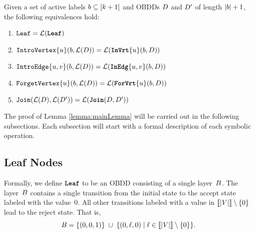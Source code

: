 \begin{lemma}
\label{lemma:mainLemma}
    Given a set of active labels $b \subseteq [k+1]$ and OBDDs $D$ and $D'$ of length $|b|+1$, the following equivalences hold:
\begin{enumerate}[label=\arabic*.,left=0pt,labelsep=2pt]
\item \label{mainLeaf} $\texttt{Leaf} = \mathcal{L}(\texttt{\textbf{Leaf}})$
\item \label{mainIntroVertex} $\texttt{IntroVertex}\{u\}(b, \mathcal{L}(D)) = \mathcal{L}(\texttt{\textbf{InVrt}}\{u\}(b,D))$
\item \label{mainIntroEdge}$\texttt{IntroEdge}\{u,v\}(b,\mathcal{L}(D)) = \mathcal{L}(\texttt{\textbf{InEdg}}\{u,v\}(b,D))$
\item \label{mainForgetVertex} $\texttt{ForgetVertex}\{u\}(b,\mathcal{L}(D)) = \mathcal{L}(\texttt{\textbf{ForVrt}}\{u\}(b,D))$
\item \label{mainJoin} $\texttt{Join}(\mathcal{L}(D),\mathcal{L}(D')) = \mathcal{L}(\texttt{\textbf{Join}}(D,D'))$
\end{enumerate}
\end{lemma}

The proof of Lemma \ref{lemma:mainLemma} will be carried out in the following subsections. Each subsection will start with a formal description of each symbolic operation.


\subsection{Leaf Nodes}


Formally, we define $\texttt{\textbf{Leaf}}$ to be an OBDD consisting of a single layer~$B$.
The layer~$B$ contains a single transition from the initial state to the accept
state labeled with the value~$0$. All other transitions labeled with a value in
$\llbracket |V| \rrbracket \setminus \{0\}$ lead to the reject state. That is,
\[
B
= \{(0,0,1)\}
\;\cup\;
\{(0,\ell,0) \mid \ell \in \llbracket |V| \rrbracket \setminus \{0\}\}.
\]



